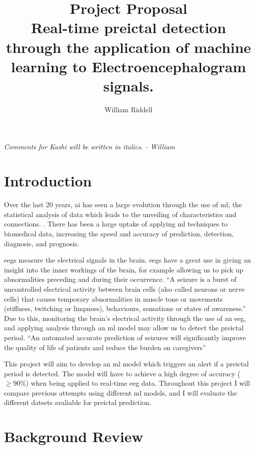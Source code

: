\documentclass[12pt]{article}
\title{Project Proposal \\ Real-time preictal detection through the application of machine learning to Electroencephalogram signals.}
\author{William Riddell}
\begin{document}
\maketitle

\textit{Comments for Kashi will be written in italics. - William}

\section{Introduction}

Over the last 20 years, \acrfull{ai} has seen a large evolution through the use of \acrfull{ml}; the statistical analysis of data which leads to the unveiling of characteristics and connections. \cite{awad2015efficient}. There has been a large uptake of applying \acrshort{ml} techniques to biomedical data, increasing the speed and accuracy of prediction, detection, diagnosis, and prognosis. 

\acrfull{eegs} measure the electrical signals in the brain. \acrshort{eegs} have a great use in giving an insight into the inner workings of the brain, for example allowing us to pick up abnormalities preceding and during their occurrence. ``A seizure is a burst of uncontrolled electrical activity between brain cells (also called neurons or nerve cells) that causes temporary abnormalities in muscle tone or movements (stiffness, twitching or limpness), behaviours, sensations or states of awareness.'' \cite{johnHopkinsTypesOfSeizures} Due to this, monitoring the brain's electrical activity through the use of an \acrshort{eeg}, and applying analysis through an \acrshort{ml} model may allow us to detect the preictal period. ``An automated accurate prediction of seizures will significantly improve the quality of life of patients and reduce the burden on caregivers'' \cite{acharya2018automated}

This project will aim to develop an \acrshort{ml} model which triggers an alert if a preictal period is detected. The model will have to achieve a high degree of accuracy ($\geq90\%$) when being applied to real-time \acrshort{eeg} data. Throughout this project I will compare previous attempts using different \acrshort{ml} models, and I will evaluate the different datsets avaliable for preictal prediction. 


\section{Background Review}
\end{document}
